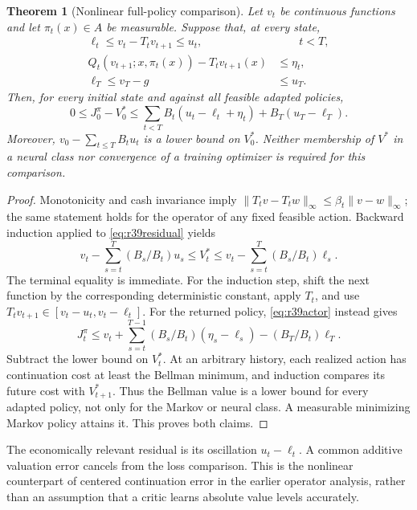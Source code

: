 \documentclass[ecta,nameyear,draft]{econsocart}
\newtheorem{theorem}{Theorem}
\theoremstyle{definition}
\theoremstyle{remark}
\begin{document}
\begin{theorem}[Nonlinear full-policy comparison]\label{thm:r39comparison}
Let $v_t$ be continuous functions and let $\pi_t(x)\in A$ be measurable.
Suppose that, at every state,
\begin{align}
 \ell_t\leq v_t-T_tv_{t+1}\leq u_t,&\qquad t<T,\label{eq:r39residual}\\
 Q_t(v_{t+1};x,\pi_t(x))-T_tv_{t+1}(x)&\leq\eta_t,\label{eq:r39actor}\\
 \ell_T\leq v_T-g&\leq u_T.\nonumber
\end{align}
Then, for every initial state and against all feasible adapted policies,
\begin{equation}\label{eq:r39loss}
 0\leq J_0^\pi-V_0^*
 \leq\sum_{t<T} B_t(u_t-\ell_t+\eta_t)+B_T(u_T-\ell_T).
\end{equation}
Moreover, $v_0-\sum_{t\leq T}B_tu_t$ is a lower bound on $V_0^*$.
Neither membership of $V^*$ in a neural class nor convergence of a training
optimizer is required for this comparison.
\end{theorem}

\begin{proof}
Monotonicity and cash invariance imply
$\|T_tv-T_tw\|_\infty\leq\beta_t\|v-w\|_\infty$; the same statement holds
for the operator of any fixed feasible action. Backward induction applied to
\eqref{eq:r39residual} yields
\[
 v_t-\sum_{s=t}^T(B_s/B_t)u_s\leq V_t^*
 \leq v_t-\sum_{s=t}^T(B_s/B_t)\ell_s.
\]
The terminal equality is immediate. For the induction step, shift the next
function by the corresponding deterministic constant, apply $T_t$, and use
$T_tv_{t+1}\in[v_t-u_t,v_t-\ell_t]$.
For the returned policy, \eqref{eq:r39actor} instead gives
\[
 J_t^\pi\leq v_t+\sum_{s=t}^{T-1}(B_s/B_t)(\eta_s-\ell_s)
                    -(B_T/B_t)\ell_T.
\]
Subtract the lower bound on $V_t^*$. At an arbitrary history, each realized
action has continuation cost at least the Bellman minimum, and induction
compares its future cost with $V_{t+1}^*$. Thus the Bellman value is a lower
bound for every adapted policy, not only for the Markov or neural class.
A measurable minimizing Markov policy attains it. This proves both claims.
\end{proof}

The economically relevant residual is its oscillation $u_t-\ell_t$.
A common additive valuation error cancels from the loss comparison. This is
the nonlinear counterpart of centered continuation error in the earlier
operator analysis, rather than an assumption that a critic learns absolute
value levels accurately.
\end{document}
